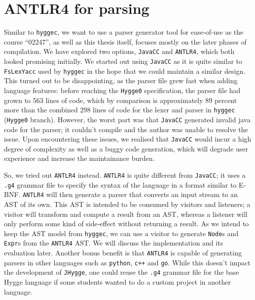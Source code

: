 \section{ANTLR4 for parsing}

Similar to \texttt{hyggec}, we want to use a parser generator tool for ease-of-use as the course ``02247'', as well as this
thesis itself, focuses mostly on the later phases of compilation. We have explored two options, \texttt{JavaCC}\cite{javacc} and \texttt{ANTLR4}\cite{antlr4},
which both looked promising initially. We started out using \texttt{JavaCC} as it is quite similar to \texttt{FsLexYacc}\cite{fslexyacc} used by
\texttt{hyggec} in the hope that we could maintain a similar design. This turned out to be disappointing, as the parser file
grew fast when adding language features: before reaching the \texttt{Hygge0} specification, the parser file had grown to 563
lines of code, which by comparison is approximately 89 percent more than the combined 298 lines of code for the lexer and
parser in \texttt{hyggec} (\texttt{Hygge0} branch). However, the worst part was that \texttt{JavaCC} generated invalid java
code for the parser; it couldn't compile and the author was unable to resolve the issue. Upon encountering these issues,
we realised that \texttt{JavaCC} would incur a high degree of complexity as well as a buggy code generation, which will
degrade user experience and increase the maintainance burden.

So, we tried out \texttt{ANTLR4} instead. \texttt{ANTLR4} is quite different from \texttt{JavaCC}; it uses a \texttt{.g4} grammar
file to specify the syntax of the language in a format similar to E-BNF\cite{ebnf}. \texttt{ANTLR4} will then generate a parser that converts
an input stream to an AST of its own. This AST is intended to be consumed by visitors and listeners\cite{antlr4_book}; a visitor will transform and
compute a result from an AST, whereas a listener will only perform some kind of side-effect without returning a result. As we
intend to keep the AST model from \texttt{hyggec}, we can use a visitor to generate \texttt{Node}s and \texttt{Expr}s from the
\texttt{ANTLR4} AST. We will discuss the implementation and its evaluation later. Another bonus benefit is that \texttt{ANTLR4}
is capable of generating parsers in other languages such as \texttt{python}, \texttt{c++} and \texttt{go}. While this doesn't
impact the development of \texttt{JHygge}, one could reuse the \texttt{.g4} grammar file for the base Hygge language if some
students wanted to do a custom project in another language.

